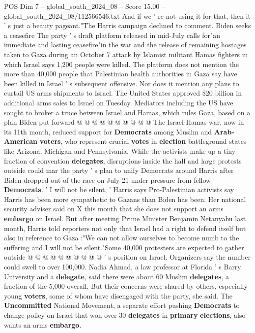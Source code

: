 \begin{textsample}{POS Dim 7 – global\_south\_2024\_08 – Score 15.00 – global\_south\_2024\_08/112566546.txt}
And if we ' re not using it for that, then it ' s just a beauty pageant."The Harris campaign declined to comment.
Biden seeks a ceasefire The party ' s draft platform released in mid-July calls for"an immediate and lasting ceasefire"in the war and the release of remaining hostages taken to Gaza during an October 7 attack by Islamist militant Hamas fighters in which Israel says 1,200 people were killed.
The platform does not mention the more than 40,000 people that Palestinian health authorities in Gaza say have been killed in Israel ' s subsequent offensive.
Nor does it mention any plans to curtail US arms shipments to Israel.
The United States approved \$20 billion in additional arms sales to Israel on Tuesday.
Mediators including the US have sought to broker a truce between Israel and Hamas, which rules Gaza, based on a plan Biden put forward @ @ @ @ @ @ @ @ @ @ The Israel-Hamas war, now in its 11th month, reduced support for \textbf{Democrats} among Muslim and \textbf{Arab-American} \textbf{voters}, who represent crucial \textbf{votes} in \textbf{election} battleground states like Arizona, Michigan and Pennsylvania.
While the activists make up a tiny fraction of convention \textbf{delegates}, disruptions inside the hall and large protests outside could mar the party ' s plan to unify Democrats around Harris after Biden dropped out of the race on July 21 under pressure from fellow \textbf{Democrats}. ' I will not be silent, ' Harris says Pro-Palestinian activists say Harris has been more sympathetic to Gazans than Biden has been.
Her national security adviser said on X this month that she does not support an arms \textbf{embargo} on Israel.
But after meeting Prime Minister Benjamin Netanyahu last month, Harris told reporters not only that Israel had a right to defend itself but also in reference to Gaza :"We can not allow ourselves to become numb to the suffering and I will not be silent."Some 40,000 protesters are expected to gather outside @ @ @ @ @ @ @ @ @ @ ' s position on Israel.
Organizers say the number could swell to over 100,000.
Nadia Ahmad, a law professor at Florida ' s Barry University and a \textbf{delegate}, said there were about 60 Muslim \textbf{delegates}, a fraction of the 5,000 overall.
But their concerns were shared by others, especially young \textbf{voters}, some of whom have disengaged with the party, she said.
The \textbf{Uncommitted} National Movement, a separate effort pushing \textbf{Democrats} to change policy on Israel that won over 30 \textbf{delegates} in \textbf{primary} \textbf{elections}, also wants an arms \textbf{embargo}.

\end{textsample}
